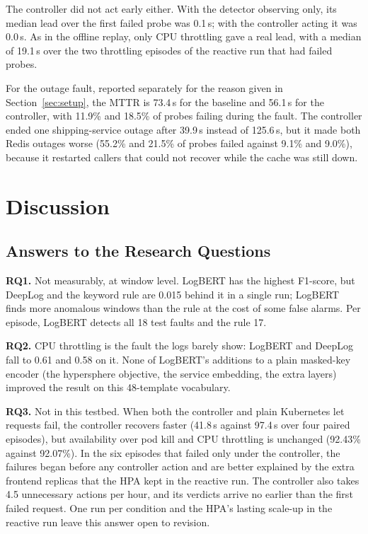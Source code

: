 \documentclass[journal]{IEEEtran}
\begin{document}
The controller did not act early either. With the detector observing only, its median lead over the first failed probe was 0.1\,s; with the controller acting it was 0.0\,s. As in the offline replay, only CPU throttling gave a real lead, with a median of 19.1\,s over the two throttling episodes of the reactive run that had failed probes.

For the outage fault, reported separately for the reason given in Section~\ref{sec:setup}, the MTTR is 73.4\,s for the baseline and 56.1\,s for the controller, with 11.9\% and 18.5\% of probes failing during the fault. The controller ended one shipping-service outage after 39.9\,s instead of 125.6\,s, but it made both Redis outages worse (55.2\% and 21.5\% of probes failed against 9.1\% and 9.0\%), because it restarted callers that could not recover while the cache was still down.

\section{Discussion}\label{sec:disc}
\subsection{Answers to the Research Questions}
\textbf{RQ1.} Not measurably, at window level. LogBERT has the highest F1-score, but DeepLog and the keyword rule are 0.015 behind it in a single run; LogBERT finds more anomalous windows than the rule at the cost of some false alarms. Per episode, LogBERT detects all 18 test faults and the rule 17.

\textbf{RQ2.} CPU throttling is the fault the logs barely show: LogBERT and DeepLog fall to 0.61 and 0.58 on it. None of LogBERT's additions to a plain masked-key encoder (the hypersphere objective, the service embedding, the extra layers) improved the result on this 48-template vocabulary.

\textbf{RQ3.} Not in this testbed. When both the controller and plain Kubernetes let requests fail, the controller recovers faster (41.8\,s against 97.4\,s over four paired episodes), but availability over pod kill and CPU throttling is unchanged (92.43\% against 92.07\%). In the six episodes that failed only under the controller, the failures began before any controller action and are better explained by the extra frontend replicas that the HPA kept in the reactive run. The controller also takes 4.5 unnecessary actions per hour, and its verdicts arrive no earlier than the first failed request. One run per condition and the HPA's lasting scale-up in the reactive run leave this answer open to revision.
\end{document}
